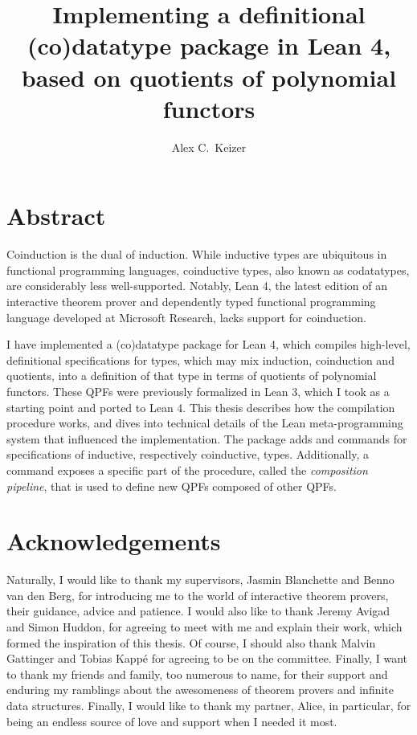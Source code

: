 
%
%
\title{Implementing a definitional (co)datatype package in Lean 4, based on quotients of polynomial functors}
\author{Alex C.\ Keizer}
\maketitle


\section*{Abstract}
Coinduction is the dual of induction. While inductive types are ubiquitous in functional programming
languages, coinductive types, also known as codatatypes, are considerably less well-supported.
Notably, Lean 4, the latest edition of an interactive theorem prover and dependently typed functional 
programming language developed at Microsoft Research, lacks support for coinduction.

I have implemented a (co)datatype package for Lean 4, which compiles high-level, definitional
specifications for types, which may mix induction, coinduction and quotients, into a definition
of that type in terms of quotients of polynomial functors.
These QPFs were previously formalized in Lean 3, which I took as a starting point and ported to Lean 4.
This thesis describes how the compilation procedure works, and dives into technical details of the Lean
meta-programming system that influenced the implementation.
The package adds \data{} and \codata{} commands for specifications of inductive, respectively coinductive, 
types. Additionally, a \qpf{} command exposes a specific part of the procedure, called the \emph{composition pipeline},
that is used to define new QPFs composed of other QPFs.





\section*{Acknowledgements}
Naturally, I would like to thank my supervisors, Jasmin Blanchette and Benno van den Berg, for 
introducing me to the world of interactive theorem provers, their guidance, advice and patience.
I would also like to thank Jeremy Avigad and Simon Huddon, for agreeing to meet with me and explain their work, which formed the inspiration of this thesis. Of course, I should also thank Malvin Gattinger and
Tobias Kappé for agreeing to be on the committee. Finally, I want to thank my friends and family, too
numerous to name, for their support and enduring my ramblings about the awesomeness of theorem provers and infinite data structures. Finally, I would like to thank my partner, Alice, in particular, for
being an endless source of love and support when I needed it most.


\tableofcontents


\newpage
{}